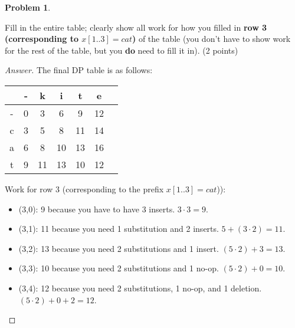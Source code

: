 \documentclass[11pt]{article}
\theoremstyle{definition}
\theoremstyle{definition}
\newtheorem{required}{Problem}
\theoremstyle{definition}
\begin{document}
\begin{required}
\begin{itemize}[(a)]
	Fill in the entire table; clearly show all work for how you filled in \textbf{row 3 (corresponding to $x[1..3]=cat$)} of the table (you don't have to show work for the rest of the table, but you \textbf{do} need to fill it in). (2 points)

	\begin{proof}[Answer]
		The final DP table is as follows:
		\begin{center}
			\begin{tabular}{|c|c|c|c|c|c|c|}
			\hline
			   & -   & k & i & t & e \\ \hline
			-  &  0  & 3 & 6 & 9 & 12 \\ \hline
			c &  3   & 5 & 8 & 11& 14 \\ \hline
			a &  6   & 8 & 10& 13& 16 \\ \hline
			t  &  9  & 11& 13& 10& 12  \\ \hline
			\end{tabular}
		\end{center}
		
		Work for row 3 (corresponding to the prefix $x[1..3] = cat$)):
		\begin{itemize}
		\item (3,0): 9 because you have to have 3 inserts. $3 \cdot 3 = 9$.\\
		
		\item (3,1): 11 because you need 1 substitution and 2 inserts. $5 + (3 \cdot 2) = 11$.\\
		
		\item (3,2): 13 because you need 2 substitutions and 1 insert. $(5 \cdot 2) + 3 = 13$.\\
		
		\item (3,3): 10 because you need 2 substitutions and 1 no-op. $(5 \cdot 2) + 0 = 10$.\\
		
		\item (3,4): 12 because you need 2 substitutions, 1 no-op, and 1 deletion. $(5 \cdot 2) + 0 + 2 = 12$.\\
		\end{itemize}
		
	\end{proof}


\end{itemize}

\end{required}


\end{document}
